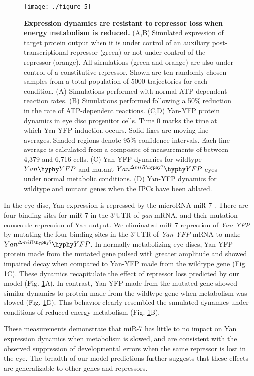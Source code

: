 \begin{figure}[h!]
\centering
\texttt{[image: ./figure\_5]}
\caption[Expression dynamics are less affected when metabolism is reduced.]{\textbf{Expression dynamics are resistant to repressor loss when energy metabolism is reduced.} (A,B) Simulated expression of target protein output when it is under control of an auxiliary post-transcriptional repressor (green) or not under control of the repressor (orange). All simulations (green and orange) are also under control of a constitutive repressor. Shown are ten randomly-chosen samples from a total population of 5000 trajectories for each condition. (A) Simulations performed with normal ATP-dependent reaction rates. (B) Simulations performed following a 50\% reduction in the rate of ATP-dependent reactions. (C,D) Yan-YFP protein dynamics in eye disc progenitor cells. Time 0 marks the time at which Yan-YFP induction occurs. Solid lines are moving line averages. Shaded regions denote 95\% confidence intervals. Each line average is calculated from a composite of measurements of between 4,379 and 6,716 cells. (C) Yan-YFP dynamics for wildtype $Yan\hyphy YFP$ and mutant $Yan^{\Delta miR\hyphy  7}\hyphy YFP$ eyes under normal metabolic conditions. (D) Yan-YFP dynamics for wildtype and mutant genes when the IPCs have been ablated.}
\label{fig:metabolism:fig5}
\end{figure}

In the eye disc, Yan expression is repressed by the microRNA miR-7 \cite{Li2005}. There are four binding sites for miR-7 in the 3'UTR of \textit{yan} mRNA, and their mutation causes de-repression of Yan output. We eliminated miR-7 repression of \textit{Yan-YFP} by mutating the four binding sites in the 3'UTR of \textit{Yan-YFP} mRNA to make $Yan^{\Delta miR\hyphy  7}\hyphy YFP$. In normally metabolizing eye discs, Yan-YFP protein made from the mutated gene pulsed with greater amplitude and showed impaired decay when compared to Yan-YFP made from the wildtype gene (Fig. \ref{fig:metabolism:fig5}C). These dynamics recapitulate the effect of repressor loss predicted by our model (Fig. \ref{fig:metabolism:fig5}A). In contrast, Yan-YFP made from the mutated gene showed similar dynamics to protein made from the wildtype gene when metabolism was slowed (Fig. \ref{fig:metabolism:fig5}D). This behavior clearly resembled the simulated dynamics under conditions of reduced energy metabolism (Fig. \ref{fig:metabolism:fig5}B).

These measurements demonstrate that miR-7 has little to no impact on Yan expression dynamics when metabolism is slowed, and are consistent with the observed suppression of developmental errors when the same repressor is lost in the eye. The breadth of our model predictions further suggests that these effects are generalizable to other genes and repressors.

